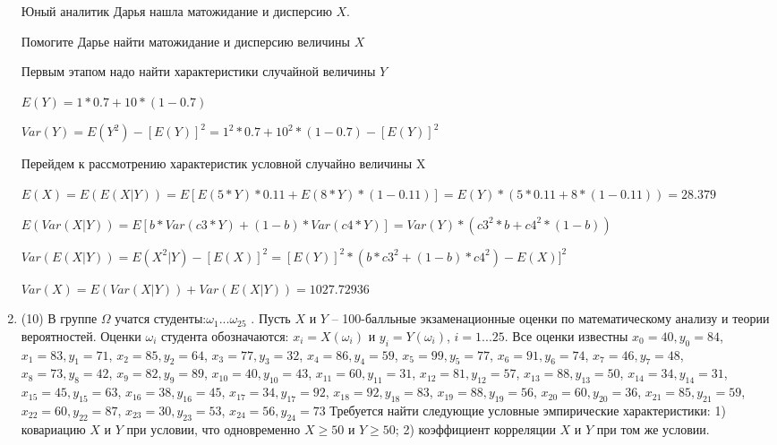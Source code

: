 \documentclass[a4paper,12pt]{article}
\begin{document}
\begin{enumerate}
	Юный аналитик Дарья нашла матожидание и дисперсию $X$.

	Помогите Дарье найти матожидание и дисперсию величины $X$
	


	

	Первым этапом надо найти характеристики случайной величины $Y$

	$E(Y) = 1 * 0.7 + 10 * (1 - 0.7)$

	$Var(Y) = E(Y^2) - [E(Y)]^2 = 1^2 * 0.7 + 10^2 * (1 - 0.7) - [E(Y)]^2$


	Перейдем к рассмотрению характеристик условной случайно величины X

	$E(X) = E(E(X|Y)) = E[E(5 * Y) * 0.11 + E(8 * Y) * (1 - 0.11)] = E(Y) * (5 * 0.11 + 8 * (1 - 0.11)) = 28.379$

	$E(Var(X|Y)) = E[b * Var(c3 * Y) + (1 - b) * Var(c4 * Y)] = Var(Y) * (c3^2 * b + c4^2 * (1- b)) $

	$Var(E(X|Y)) = E(X^2|Y) - [E(X)]^2 = [E(Y)]^2 * (b * c3^2 + (1-b)*c4^2) - E(X)]^2$

	$Var(X) = E(Var(X|Y)) + Var(E(X|Y)) = 1027.72936$
	

\item


(10) В группе $\Omega$ учатся студенты:$\omega _{1}...\omega _{25}$ . Пусть $X$ и $Y$ – 100-балльные экзаменационные оценки по
математическому анализу и теории вероятностей. Оценки $\omega _{i}$ студента обозначаются: $x _{i} = X(\omega _{i})$ и $y _{i} = Y(\omega _{i})$, $i = 1...25$. Все оценки известны
$x _{0} = 40, y _{0} = 84$, $x _{1} = 83, y _{1} = 71$, $x _{2} = 85, y _{2} = 64$, $x _{3} = 77, y _{3} = 32$, $x _{4} = 86, y _{4} = 59$, $x _{5} = 99, y _{5} = 77$, $x _{6} = 91, y _{6} = 74$, $x _{7} = 46, y _{7} = 48$, $x _{8} = 73, y _{8} = 42$, $x _{9} = 82, y _{9} = 89$, $x _{10} = 40, y _{10} = 43$, $x _{11} = 60, y _{11} = 31$, $x _{12} = 81, y _{12} = 57$, $x _{13} = 88, y _{13} = 50$, $x _{14} = 34, y _{14} = 31$, $x _{15} = 45, y _{15} = 63$, $x _{16} = 38, y _{16} = 45$, $x _{17} = 34, y _{17} = 92$, $x _{18} = 92, y _{18} = 83$, $x _{19} = 88, y _{19} = 56$, $x _{20} = 60, y _{20} = 36$, $x _{21} = 85, y _{21} = 59$, $x _{22} = 60, y _{22} = 87$, $x _{23} = 30, y _{23} = 53$, $x _{24} = 56, y _{24} = 73$
Требуется
найти следующие условные эмпирические характеристики: 1) ковариацию $X$ и $Y$ при условии, что одновременно $X \geqslant 50$
 и $Y \geqslant 50$; 2) коэффициент корреляции $X$ и $Y$ при том же условии.





\end{enumerate}
\end{document}

